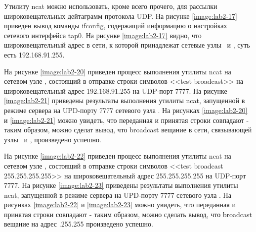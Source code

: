 
	Утилиту ncat можно использовать, кроме всего прочего, для рассылки широковещательных дейтаграмм протокола UDP.
	На рисунке \ref{image:lab2-17} приведен вывод команды ifconfig, содержащий информацию о настройках сетевого интерфейса tap0.
	На рисунке \ref{image:lab2-17} видно, что широковещательный адрес в сети, к которой принадлежат сетевые узлы \myip\ и \virtip, суть есть 192.168.91.255.

	На рисунке \ref{image:lab2-20} приведен процесс выполнения утилиты ncat на сетевом узле \linebreak \myip,
	состоящий в отправке строки символов <<test broadcast>> на широковещательный адрес 192.168.91.255 на UDP-порт 7777.
	На рисунке \ref{image:lab2-21} приведены результаты выполнения утилиты ncat, запущенной в режиме сервера на UPD-порту 7777 сетевого узла \virtip.
	На рисунках \ref{image:lab2-20} и \ref{image:lab2-21} можно увидеть, что переданная и принятая строки совпадают -
	таким образом, можно сделат вывод, что broadcast вещание в сети, связывающей узлы \myip\ и \virtip, произведено успешно.


	На рисунке \ref{image:lab2-22} приведен процесс выполнения утилиты ncat на сетевом узле \myip,
	состоящий в отправке строки символов <<test broadcast 255.255.255.255>> на широковещательный адрес 255.255.255.255 на UDP-порт 7777.
	На рисунке \ref{image:lab2-23} приведены результаты выполнения утилиты ncat, запущенной в режиме сервера на UPD-порту 7777 сетевого узла \virtip.
	На рисунках \ref{image:lab2-22} и \ref{image:lab2-23} можно увидеть, что переданная и принятая строки совпадают - таким образом, можно сделать вывод, что
	broadcast вещание на адрес .255.255 произведено успешно.


